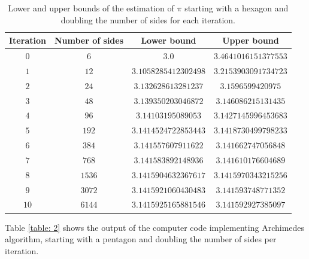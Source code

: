 \documentclass{article}
\begin{document}
\begin{table}[ht]
    \centering
    \begin{tabular}{ |c|c|c|c| }
    \hline
        Iteration&Number of sides&Lower bound&Upper bound \\
        \hline
        $0$ & $6$ & $3.0$ & $3.4641016151377553$ \\
        \hline
        $1$ & $12$ & $3.1058285412302498$ & $3.2153903091734723$ \\
        \hline
        $2$ & $24$ & $3.132628613281237$ & $3.1596599420975$ \\
        \hline
        $3$ & $48$ & $3.139350203046872$ & $3.146086215131435$ \\
        \hline
        $4$ & $96$ & $3.14103195089053$ & $3.1427145996453683$ \\
        \hline
        $5$ & $192$ & $3.1414524722853443$ & $3.1418730499798233$ \\
        \hline
        $6$ & $384$ & $3.141557607911622$ & $3.141662747056848$ \\
        \hline
        $7$ & $768$ & $3.141583892148936$ & $3.141610176604689$ \\
        \hline
        $8$ & $1536$ & $3.1415904632367617$ & $3.1415970343215256$ \\
        \hline
        $9$ & $3072$ & $3.1415921060430483$ & $3.141593748771352$ \\
        \hline
        $10$ & $6144$ & $3.1415925165881546$ & $3.141592927385097$ \\
        \hline
    \end{tabular}
    \caption{Lower and upper bounds of the estimation of $\pi$ starting with a hexagon and doubling the number of sides for each iteration.}
    \label{table: 1}
\end{table}
\clearpage
Table \ref{table: 2} shows the output of the computer code implementing Archimedes algorithm, starting with a pentagon and doubling the number of sides per iteration.
\end{document}
